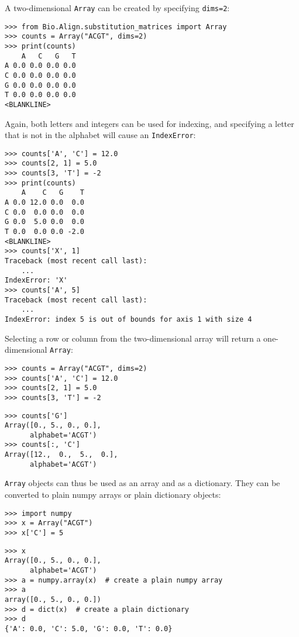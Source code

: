 A two-dimensional \verb+Array+ can be created by specifying \verb+dims=2+:

\begin{verbatim}
>>> from Bio.Align.substitution_matrices import Array
>>> counts = Array("ACGT", dims=2)
>>> print(counts)
    A   C   G   T
A 0.0 0.0 0.0 0.0
C 0.0 0.0 0.0 0.0
G 0.0 0.0 0.0 0.0
T 0.0 0.0 0.0 0.0
<BLANKLINE>
\end{verbatim}
Again, both letters and integers can be used for indexing, and specifying a letter that is not in the alphabet will cause an \verb+IndexError+:

\begin{verbatim}
>>> counts['A', 'C'] = 12.0
>>> counts[2, 1] = 5.0
>>> counts[3, 'T'] = -2
>>> print(counts)
    A    C   G    T
A 0.0 12.0 0.0  0.0
C 0.0  0.0 0.0  0.0
G 0.0  5.0 0.0  0.0
T 0.0  0.0 0.0 -2.0
<BLANKLINE>
>>> counts['X', 1]
Traceback (most recent call last):
    ...
IndexError: 'X'
>>> counts['A', 5]
Traceback (most recent call last):
    ...
IndexError: index 5 is out of bounds for axis 1 with size 4
\end{verbatim}
Selecting a row or column from the two-dimensional array will return a one-dimensional \verb+Array+:

\begin{verbatim}
>>> counts = Array("ACGT", dims=2)
>>> counts['A', 'C'] = 12.0
>>> counts[2, 1] = 5.0
>>> counts[3, 'T'] = -2
\end{verbatim}
\begin{verbatim}
>>> counts['G']
Array([0., 5., 0., 0.],
      alphabet='ACGT')
>>> counts[:, 'C']
Array([12.,  0.,  5.,  0.],
      alphabet='ACGT')
\end{verbatim}

\verb+Array+ objects can thus be used as an array and as a dictionary. They can be converted to plain numpy arrays or plain dictionary objects:

\begin{verbatim}
>>> import numpy
>>> x = Array("ACGT")
>>> x['C'] = 5
\end{verbatim}
\begin{verbatim}
>>> x
Array([0., 5., 0., 0.],
      alphabet='ACGT')
>>> a = numpy.array(x)  # create a plain numpy array
>>> a
array([0., 5., 0., 0.])
>>> d = dict(x)  # create a plain dictionary
>>> d
{'A': 0.0, 'C': 5.0, 'G': 0.0, 'T': 0.0}
\end{verbatim}

